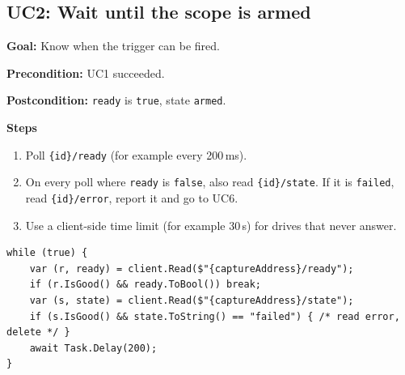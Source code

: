 \documentclass[11pt,a4paper]{article}
\newcommand{\dl}[1]{\texttt{#1}}
\newenvironment{usecase}[1]
  {\subsection{#1}}
  {}
\newcommand{\ucfield}[2]{\par\noindent\textbf{#1:} #2\par}
\begin{document}
\begin{usecase}{UC2: Wait until the scope is armed}
\ucfield{Goal}{Know when the trigger can be fired.}
\ucfield{Precondition}{UC1 succeeded.}
\ucfield{Postcondition}{\dl{ready} is \dl{true}, state \dl{armed}.}

\textbf{Steps}
\begin{enumerate}[nosep]
  \item Poll \dl{\{id\}/ready} (for example every 200\,ms).
  \item On every poll where \dl{ready} is \dl{false}, also read \dl{\{id\}/state}.
        If it is \dl{failed}, read \dl{\{id\}/error}, report it and go to UC6.
  \item Use a client-side time limit (for example 30\,s) for drives that never
        answer.
\end{enumerate}

\begin{lstlisting}[language={[Sharp]C}]
while (true) {
    var (r, ready) = client.Read($"{captureAddress}/ready");
    if (r.IsGood() && ready.ToBool()) break;
    var (s, state) = client.Read($"{captureAddress}/state");
    if (s.IsGood() && state.ToString() == "failed") { /* read error, delete */ }
    await Task.Delay(200);
}
\end{lstlisting}
\end{usecase}
\end{document}
